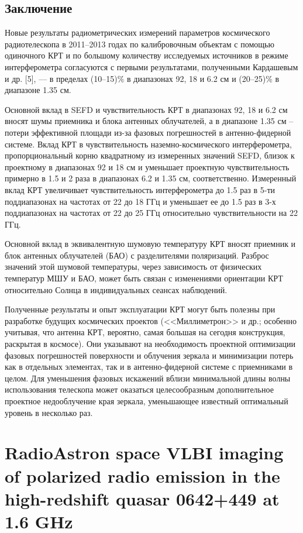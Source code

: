 \subsection{Заключение}

Новые результаты радиометрических измерений параметров космического радиотелескопа в 2011–2013 годах
по калибровочным объектам с помощью одиночного КРТ и по большому количеству исследуемых источников в
режиме интерферометра согласуются с первыми результатами, полученными Кардашевым и др. [5], --- в
пределах (10--15)\% в диапазонах 92, 18 и 6.2 см и (20--25)\% в диапазоне 1.35 см.

Основной вклад в SEFD и чувствительность КРТ в диапазонах 92, 18 и 6.2 см вносят шумы приемника и
блока антенных облучателей, а в диапазоне 1.35 см – потери эффективной площади из-за фазовых
погрешностей в антенно-фидерной системе. Вклад КРТ в чувствительность наземно-космического
интерферометра, пропорциональный корню квадратному из измеренных значений SEFD, близок к проектному
в диапазонах 92 и 18 см и уменьшает проектную чувствительность примерно в 1.5 и 2 раза в диапазонах
6.2 и 1.35 см, соответственно. Измеренный вклад КРТ увеличивает чувствительность интерферометра до
1.5 раз в 5-ти поддиапазонах на частотах от 22 до 18 ГГц и уменьшает ее до 1.5 раз в 3-х
поддиапазонах на частотах от 22 до 25 ГГц относительно чувствительности на 22 ГГц.

Основной вклад в эквивалентную шумовую температуру КРТ вносят приемник и блок антенных облучателей
(БАО) с разделителями поляризаций. Разброс значений этой шумовой температуры, через зависимость от
физических температур МШУ и БАО, может быть связан с изменениями ориентации КРТ относительно Солнца
в индивидуальных сеансах наблюдений.

Полученные результаты и опыт эксплуатации КРТ могут быть полезны при разработке будущих космических
проектов (<<Миллиметрон>> и др.; особенно учитывая, что антенна КРТ, вероятно, самая большая на
сегодня конструкция, раскрытая в космосе). Они указывают на необходимость проектной оптимизации
фазовых погрешностей поверхности и облучения зеркала и минимизации потерь как в отдельных элементах,
так и в антенно-фидерной системе с приемниками в целом. Для уменьшения фазовых искажений вблизи
минимальной длины волны использования телескопа может оказаться целесообразным дополнительное
проектное недооблучение края зеркала, уменьшающее известный оптимальный уровень в несколько раз.


\section{RadioAstron space VLBI imaging of polarized radio emission in the high-redshift quasar
0642+449 at 1.6 GHz}

